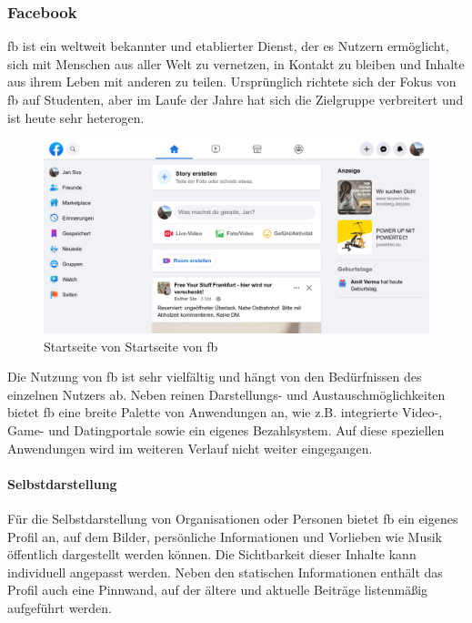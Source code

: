 \subsubsection{Facebook}

\acrfull{fb} ist ein weltweit bekannter und etablierter Dienst, der es Nutzern ermöglicht, sich mit Menschen aus aller Welt zu vernetzen, in Kontakt zu bleiben und Inhalte aus ihrem Leben mit anderen zu teilen.
Ursprünglich richtete sich der Fokus von \acrshort{fb}  auf Studenten, aber im Laufe der Jahre hat sich die Zielgruppe verbreitert und ist heute sehr heterogen.

\begin{figure}[!htb]
    \centering
    \includegraphics[width=\textwidth]{figures/jan/pic_facebook.png}
    \caption[Startseite von \acrshort{fb}]{Startseite von Startseite von \acrshort{fb}}
    \label{fig:facebook}
\end{figure}

Die Nutzung von \acrshort{fb} ist sehr vielfältig und hängt von den Bedürfnissen des einzelnen Nutzers ab. Neben reinen Darstellungs- und Austauschmöglichkeiten bietet \acrshort{fb} eine breite Palette von Anwendungen an, wie z.B. integrierte Video-, Game- und Datingportale sowie ein eigenes Bezahlsystem. Auf diese speziellen Anwendungen wird im weiteren Verlauf nicht weiter eingegangen.

\paragraph{Selbstdarstellung}

Für die Selbstdarstellung von Organisationen oder Personen bietet \acrshort{fb} ein eigenes Profil an, auf dem Bilder, persönliche Informationen und Vorlieben wie Musik öffentlich dargestellt werden können. Die Sichtbarkeit dieser Inhalte kann individuell angepasst werden. Neben den statischen Informationen enthält das Profil auch eine Pinnwand, auf der ältere und aktuelle Beiträge listenmäßig aufgeführt werden.

